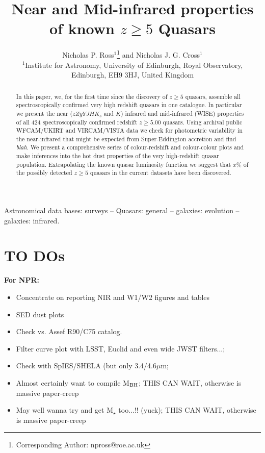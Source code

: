 \documentclass[usenatbib]{mnras}
\begin{document}
\title[Very high-$z$ Quasars]
        {Near and Mid-infrared properties of known $z\geq5$ Quasars}
\author[Ross \& Cross]
       {Nicholas P. Ross$^{1}$\thanks{Corresponding Author: npross@roe.ac.uk} and Nicholas J. G. Cross$^{1}$
\\ 
$^1$Institute for Astronomy, University of Edinburgh, Royal Observatory, Edinburgh, EH9 3HJ, United Kingdom\\
}

\maketitle
\begin{abstract}
In this paper, we, for the first time since the discovery of $z\geq5$
quasars, assemble all spectroscopically confirmed very high redshift
quasars in one catalogue.  In particular we present the near
($zZyYJHK_{s}$ and $K$) infrared and mid-infrared (WISE) properties of
all 424 spectroscopically confirmed redshift $z\geq5.00$ quasars.
Using archival public WFCAM/UKIRT and VIRCAM/VISTA data we check for
photometric variability in the near-infrared that might be expected
from Super-Eddington accretion and find {\it blah}.  We present a
comprehensive series of colour-redshift and colour-colour plots and
make inferences into the hot dust properties of the very high-redshift
quasar population. Extrapolating the known quasar luminosity function
we suggest that $x$\% of the possibly detected $z\geq5$ quasars in the
current datasets have been discovered.
\end{abstract}


\begin{keywords}
Astronomical data bases: surveys -- 
Quasars: general -- 
galaxies: evolution -- 
galaxies: infrared.
\end{keywords}

\iffalse
\section*{TO DOs}
{\bf For NPR: }
\begin{itemize}
\item Concentrate on reporting NIR and W1/W2 figures and tables
\item SED dust plots 
\item Check vs. Assef R90/C75 catalog.
\item Filter curve plot with LSST, Euclid and even wide JWST filters...; 
\item Check with SpIES/SHELA (but only 3.4/4.6$\mu$m; 
\item Almost certainly want to compile M$_{\rm BH}$; THIS CAN WAIT, otherwise is massive paper-creep
\item May well wanna try and get M$_{\star}$ too...!! (yuck); THIS CAN WAIT, otherwise is massive paper-creep
\end{itemize}
\end{document}
